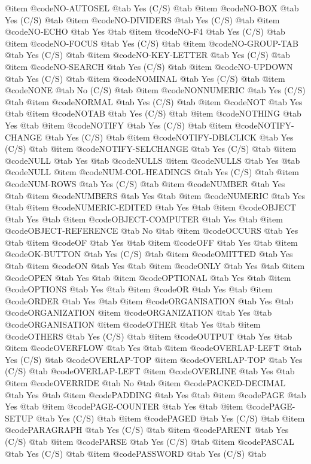 @item @code{NO-AUTOSEL} @tab Yes	(C/S) @tab
@item @code{NO-BOX} @tab Yes	(C/S) @tab
@item @code{NO-DIVIDERS} @tab Yes	(C/S) @tab
@item @code{NO-ECHO} @tab Yes @tab
@item @code{NO-F4} @tab Yes	(C/S) @tab
@item @code{NO-FOCUS} @tab Yes	(C/S) @tab
@item @code{NO-GROUP-TAB} @tab Yes	(C/S) @tab
@item @code{NO-KEY-LETTER} @tab Yes	(C/S) @tab
@item @code{NO-SEARCH} @tab Yes	(C/S) @tab
@item @code{NO-UPDOWN} @tab Yes	(C/S) @tab
@item @code{NOMINAL} @tab Yes (C/S) @tab
@item @code{NONE} @tab No	(C/S) @tab
@item @code{NONNUMERIC} @tab Yes	(C/S) @tab
@item @code{NORMAL} @tab Yes	(C/S) @tab
@item @code{NOT} @tab Yes @tab
@item @code{NOTAB} @tab Yes	(C/S) @tab
@item @code{NOTHING} @tab Yes @tab
@item @code{NOTIFY} @tab Yes	(C/S) @tab
@item @code{NOTIFY-CHANGE} @tab Yes	(C/S) @tab
@item @code{NOTIFY-DBLCLICK} @tab Yes	(C/S) @tab
@item @code{NOTIFY-SELCHANGE} @tab Yes	(C/S) @tab
@item @code{NULL} @tab Yes @tab @code{NULLS}
@item @code{NULLS} @tab Yes @tab @code{NULL}
@item @code{NUM-COL-HEADINGS} @tab Yes	(C/S) @tab
@item @code{NUM-ROWS} @tab Yes	(C/S) @tab
@item @code{NUMBER} @tab Yes @tab
@item @code{NUMBERS} @tab Yes @tab
@item @code{NUMERIC} @tab Yes @tab
@item @code{NUMERIC-EDITED} @tab Yes @tab
@item @code{OBJECT} @tab Yes @tab
@item @code{OBJECT-COMPUTER} @tab Yes @tab
@item @code{OBJECT-REFERENCE} @tab No @tab
@item @code{OCCURS} @tab Yes @tab
@item @code{OF} @tab Yes @tab
@item @code{OFF} @tab Yes @tab
@item @code{OK-BUTTON} @tab Yes	(C/S) @tab
@item @code{OMITTED} @tab Yes @tab
@item @code{ON} @tab Yes @tab
@item @code{ONLY} @tab Yes @tab
@item @code{OPEN} @tab Yes @tab
@item @code{OPTIONAL} @tab Yes @tab
@item @code{OPTIONS} @tab Yes @tab
@item @code{OR} @tab Yes @tab
@item @code{ORDER} @tab Yes @tab
@item @code{ORGANISATION} @tab Yes @tab @code{ORGANIZATION}
@item @code{ORGANIZATION} @tab Yes @tab @code{ORGANISATION}
@item @code{OTHER} @tab Yes @tab
@item @code{OTHERS} @tab Yes	(C/S) @tab
@item @code{OUTPUT} @tab Yes @tab
@item @code{OVERFLOW} @tab Yes @tab
@item @code{OVERLAP-LEFT} @tab Yes	(C/S) @tab @code{OVERLAP-TOP}
@item @code{OVERLAP-TOP} @tab Yes	(C/S) @tab @code{OVERLAP-LEFT}
@item @code{OVERLINE} @tab Yes @tab
@item @code{OVERRIDE} @tab No @tab
@item @code{PACKED-DECIMAL} @tab Yes @tab
@item @code{PADDING} @tab Yes @tab
@item @code{PAGE} @tab Yes @tab
@item @code{PAGE-COUNTER} @tab Yes @tab
@item @code{PAGE-SETUP} @tab Yes	(C/S) @tab
@item @code{PAGED} @tab Yes	(C/S) @tab
@item @code{PARAGRAPH} @tab Yes	(C/S) @tab
@item @code{PARENT} @tab Yes	(C/S) @tab
@item @code{PARSE} @tab Yes	(C/S) @tab
@item @code{PASCAL} @tab Yes	(C/S) @tab
@item @code{PASSWORD} @tab Yes	(C/S) @tab
